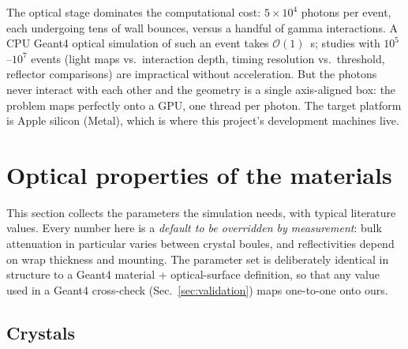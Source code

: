 \documentclass[11pt,a4paper]{article}
\begin{document}
The optical stage dominates the computational cost: $5\times10^4$ photons per event, each
undergoing tens of wall bounces, versus a handful of gamma interactions. A CPU Geant4 optical
simulation of such an event takes $\mathcal{O}(1)$~s; studies with $10^5$--$10^7$ events (light
maps vs.\ interaction depth, timing resolution vs.\ threshold, reflector comparisons) are
impractical without acceleration. But the photons never interact with each other and the
geometry is a single axis-aligned box: the problem maps perfectly onto a GPU, one thread per
photon. The target platform is Apple silicon (Metal), which is where this project's
development machines live.

\section{Optical properties of the materials}
\label{sec:properties}

This section collects the parameters the simulation needs, with typical literature values.
Every number here is a \emph{default to be overridden by measurement}: bulk attenuation in
particular varies between crystal boules, and reflectivities depend on wrap thickness and
mounting. The parameter set is deliberately identical in structure to a Geant4 material +
optical-surface definition, so that any value used in a Geant4 cross-check
(Sec.~\ref{sec:validation}) maps one-to-one onto ours.

\subsection{Crystals}
\label{sec:crystals}
\end{document}
